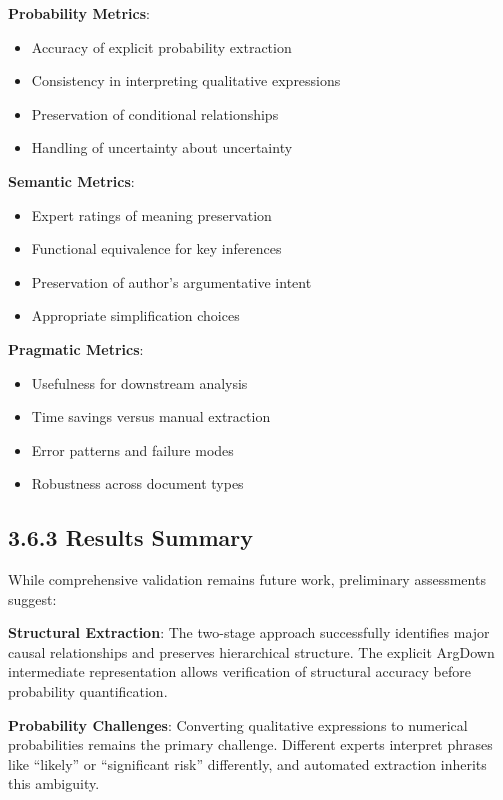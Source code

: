 \documentclass[
  11pt,
  letterpaper,
]{book}
\providecommand{\tightlist}{%
  \setlength{\itemsep}{0pt}\setlength{\parskip}{0pt}}
\begin{document}
\textbf{Probability Metrics}:

\begin{itemize}
\tightlist
\item
  Accuracy of explicit probability extraction
\item
  Consistency in interpreting qualitative expressions
\item
  Preservation of conditional relationships
\item
  Handling of uncertainty about uncertainty
\end{itemize}

\textbf{Semantic Metrics}:

\begin{itemize}
\tightlist
\item
  Expert ratings of meaning preservation
\item
  Functional equivalence for key inferences
\item
  Preservation of author's argumentative intent
\item
  Appropriate simplification choices
\end{itemize}

\textbf{Pragmatic Metrics}:

\begin{itemize}
\tightlist
\item
  Usefulness for downstream analysis
\item
  Time savings versus manual extraction
\item
  Error patterns and failure modes
\item
  Robustness across document types
\end{itemize}

\subsection{3.6.3 Results Summary}\label{sec-validation-results}

While comprehensive validation remains future work, preliminary
assessments suggest:

\textbf{Structural Extraction}: The two-stage approach successfully
identifies major causal relationships and preserves hierarchical
structure. The explicit ArgDown intermediate representation allows
verification of structural accuracy before probability quantification.

\textbf{Probability Challenges}: Converting qualitative expressions to
numerical probabilities remains the primary challenge. Different experts
interpret phrases like ``likely'' or ``significant risk'' differently,
and automated extraction inherits this ambiguity.
\end{document}
